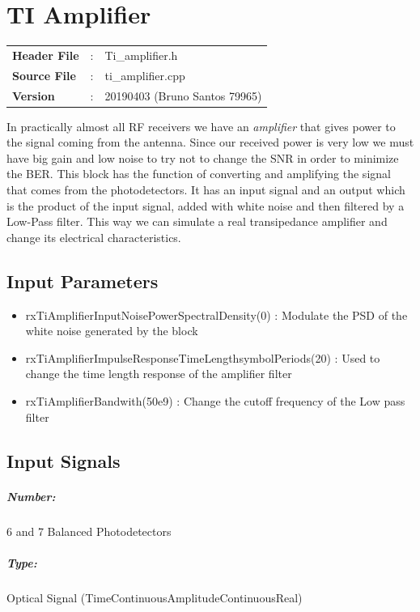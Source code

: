 \clearpage
\section{TI Amplifier}
\begin{tcolorbox}	
	\begin{tabular}{p{2.75cm} p{0.2cm} p{10.5cm}} 	
		\textbf{Header File}   &:& Ti\_amplifier.h \\
		\textbf{Source File}   &:& ti\_amplifier.cpp \\
		\textbf{Version}       &:& 20190403 (Bruno Santos 79965)\\
	\end{tabular}
\end{tcolorbox}
\maketitle
In practically almost all RF receivers we have an \textit{amplifier} that gives power to the signal coming from the antenna. Since our received power is very low we must have big gain and low noise to try not to change the SNR in order to minimize the BER. \newline
This block has the function of converting and amplifying the signal that comes from the photodetectors. It has an input signal and an output which is the product of the input signal, added with white noise and then filtered by a Low-Pass filter. This way we can simulate a real transipedance amplifier and change its electrical characteristics.


\subsection*{Input Parameters}

\begin{itemize}
	\item rxTiAmplifierInputNoisePowerSpectralDensity(0) :  Modulate the PSD of the white noise generated by the block
	\item rxTiAmplifierImpulseResponseTimeLengthsymbolPeriods(20) : Used to change the time length response of the amplifier filter
	\item rxTiAmplifierBandwith(50e9) : Change the cutoff frequency of the Low pass filter
\end{itemize}


\subsection*{Input Signals}
\subparagraph*{Number:} 6 and 7 Balanced Photodetectors
\subparagraph*{Type:} Optical Signal (TimeContinuousAmplitudeContinuousReal)
